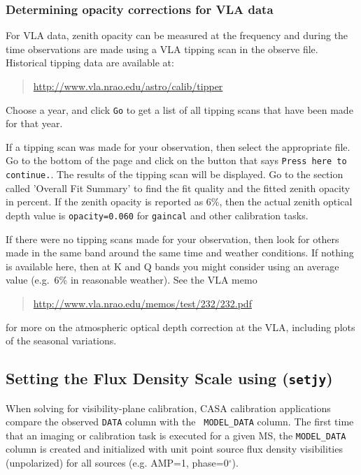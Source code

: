 
\subsubsection{Determining opacity corrections for VLA data}
\label{section:cal.prior.opacity.vla}

For VLA data, zenith opacity can be measured at the frequency
and during the time observations are made using a VLA tipping scan in
the observe file.  Historical tipping data are available at:
\begin{quote}
   \url{http://www.vla.nrao.edu/astro/calib/tipper}
\end{quote}
Choose a year, and click {\tt Go} to get a list of all tipping scans
that have been made for that year.

If a tipping scan was made for your observation, then select the
appropriate file.  Go to the bottom of the page and click on the
button that says {\tt Press here to continue.}.  The results of the
tipping scan will be displayed.  Go to the section called 'Overall Fit
Summary' to find the fit quality and the fitted zenith opacity in
percent.  If the zenith opacity is reported as 6\%, then the actual
zenith optical depth value is {\tt opacity=0.060} for {\tt gaincal}
and other calibration tasks.

If there were no tipping scans made for your observation, then look
for others made in the same band around the same time and weather
conditions.  If nothing is available here, then at K and Q bands
you might consider using an average value (e.g.\ 6\% in reasonable
weather).  See the VLA memo
\begin{quote}
   \url{http://www.vla.nrao.edu/memos/test/232/232.pdf}
\end{quote}
for more on the atmospheric optical depth correction at the VLA,
including plots of the seasonal variations.

\subsection{Setting the Flux Density Scale using ({\tt setjy})}
\label{section:cal.prior.models}

When solving for visibility-plane calibration, CASA calibration
applications compare the observed {\tt DATA} column with the {\tt
  MODEL\_DATA} column.  The first time that an imaging or calibration
task is executed for a given MS, the {\tt MODEL\_DATA} column is
created and initialized with unit point source flux density
visibilities (unpolarized) for all sources (e.g. AMP=1,
phase=0$^{\circ}$).  

